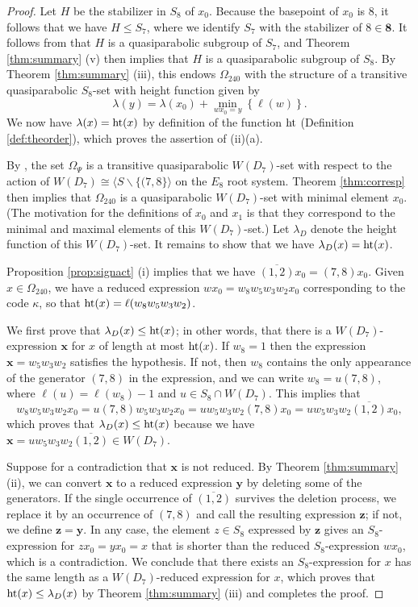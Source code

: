 \documentclass{amsart}
\theoremstyle{plain}
\theoremstyle{definition}
\theoremstyle{remark}
\numberwithin{equation}{section}
\newcommand{\rootht}{\text{\rm ht}}
\newcommand{\bfx}{\mathbf{x}}
\newcommand{\bfy}{\mathbf{y}}
\newcommand{\bfz}{\mathbf{z}}
\newcommand{\eight}{{\mathbf 8}}
\newcommand{\qpx}{\Omega_{240}}
\newcommand{\qp}{\Omega}
\newcommand{\leh}{\kappa}
\begin{document}
\begin{proof}
Let $H$ be the stabilizer in $S_8$ of $x_0$. Because the basepoint of $x_0$ is $8$, it follows that we have 
$H \leq S_7$, where we identify $S_7$ with the stabilizer of $8 \in \eight$. It follows from 
\cite[\S6.2]{gx5} that $H$ is a quasiparabolic subgroup of $S_7$, and Theorem \ref{thm:summary} (v) then 
implies that $H$ is a quasiparabolic subgroup of $S_8$. By Theorem \ref{thm:summary} (iii), this endows
$\qpx$ with the structure of a transitive quasiparabolic $S_8$-set with height function given by $$
\lambda(y) = \lambda(x_0) + \min_{wx_0 = y} \left\{ \ell(w) \right\}
.$$ We now have $\lambda(x) = \rootht(x)$ by definition of the function $\rootht$ (Definition \ref{def:theorder}),
which proves the assertion of (ii)(a).

By \cite[\S6.3]{gx5}, the set $\qp_\Psi$ is a transitive quasiparabolic $W(D_7)$-set with respect to the action
of $W(D_7) \cong \langle S \backslash \{(7, 8\} \rangle$ on the $E_8$ root system. Theorem \ref{thm:corresp} then
implies that $\qpx$ is a quasiparabolic $W(D_7)$-set with minimal element $x_0$. (The motivation for the 
definitions of $x_0$ and $x_1$ is that they correspond to the minimal and maximal elements of this $W(D_7)$-set.) 
Let $\lambda_D$ denote the height function of this $W(D_7)$-set. It remains to show that we have 
$\lambda_D(x) = \rootht(x)$.

Proposition \ref{prop:signact} (i) implies that we have $\overline{(1, 2)}x_0 = (7, 8)x_0$. Given $x \in \qpx$, we
have a reduced expression $w x_0 = w_8 w_5 w_3 w_2 x_0$ corresponding to the code $\leh$, so that $\rootht(x) = 
\ell(w_8 w_5 w_3 w_2)$. 

We first prove that $\lambda_D(x) \leq \rootht(x)$; in other words, that there is a $W(D_7)$-expression $\bfx$ for 
$x$ of length at most $\rootht(x)$. If $w_8 = 1$ then the expression $\bfx = w_5 w_3 w_2$ satisfies the hypothesis.
If not, then $w_8$ contains the only appearance of the generator $(7, 8)$ in the expression, and we can write
$w_8 = u (7, 8)$, where $\ell(u) = \ell(w_8) - 1$ and $u \in S_8 \cap W(D_7)$. This implies that $$
w_8 w_5 w_3 w_2 x_0 = u (7, 8) w_5 w_3 w_2 x_0 = u w_5 w_3 w_2 (7, 8) x_0 = u w_5 w_3 w_2 \overline{(1, 2)} x_0
,$$ which proves that $\lambda_D(x) \leq \rootht(x)$ because we have 
$\bfx = uw_5w_3w_2 \overline{(1, 2)} \in W(D_7)$.

Suppose for a contradiction that $\bfx$ is not reduced. By Theorem \ref{thm:summary} (ii), we can convert $\bfx$ to 
a reduced expression $\bfy$ by deleting some of the generators. If the single occurrence of $\overline{(1, 2)}$
survives the deletion process, we replace it by an occurrence of $(7, 8)$ and call the resulting expression $\bfz$; 
if not, we define $\bfz = \bfy$. In any case, the element $z \in S_8$ expressed by $\bfz$ gives an $S_8$-expression 
for $zx_0 = yx_0 = x$ that is shorter than the reduced $S_8$-expression $wx_0$, which is a contradiction. We conclude 
that there exists an $S_8$-expression for $x$ has the same length as a $W(D_7)$-reduced expression
for $x$, which proves that $\rootht(x) \leq \lambda_D(x)$ by Theorem \ref{thm:summary} (iii) and completes the proof. 
\end{proof}
\end{document}
